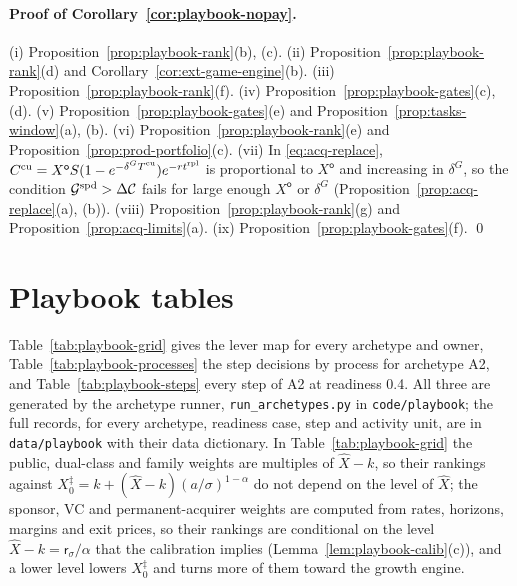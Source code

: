 \paragraph{Proof of Corollary~\ref{cor:playbook-nopay}.}
(i) Proposition~\ref{prop:playbook-rank}(b), (c). (ii) Proposition~\ref{prop:playbook-rank}(d) and Corollary~\ref{cor:ext-game-engine}(b). (iii) Proposition~\ref{prop:playbook-rank}(f). (iv) Proposition~\ref{prop:playbook-gates}(c), (d). (v) Proposition~\ref{prop:playbook-gates}(e) and Proposition~\ref{prop:tasks-window}(a), (b). (vi) Proposition~\ref{prop:playbook-rank}(e) and Proposition~\ref{prop:prod-portfolio}(c). (vii) In \eqref{eq:acq-replace}, $C^{\rm cu}=X^{\mathsf o}S(1-e^{-\delta^GT^{\rm cu}})e^{-rt^{\rm rpl}}$ is proportional to $X^{\mathsf o}$ and increasing in $\delta^G$, so the condition $\mathcal G^{\rm spd}>\Delta\mathcal C$ fails for large enough $X^{\mathsf o}$ or $\delta^G$ (Proposition~\ref{prop:acq-replace}(a), (b)). (viii) Proposition~\ref{prop:playbook-rank}(g) and Proposition~\ref{prop:acq-limits}(a). (ix) Proposition~\ref{prop:playbook-gates}(f). \qed

\section{Playbook tables}\label{app:playbook-tables}

Table~\ref{tab:playbook-grid} gives the lever map for every archetype and owner, Table~\ref{tab:playbook-processes} the step decisions by process for archetype A2, and Table~\ref{tab:playbook-steps} every step of A2 at readiness 0.4. All three are generated by the archetype runner, \texttt{run\_archetypes.py} in \texttt{code/playbook}; the full records, for every archetype, readiness case, step and activity unit, are in \texttt{data/playbook} with their data dictionary. In Table~\ref{tab:playbook-grid} the public, dual-class and family weights are multiples of $\hat X-k$, so their rankings against $X^\ddagger_0=k+(\hat X-k)(a/\sigma)^{1-\alpha}$ do not depend on the level of $\hat X$; the sponsor, VC and permanent-acquirer weights are computed from rates, horizons, margins and exit prices, so their rankings are conditional on the level $\hat X-k=\mathsf r_\sigma/\alpha$ that the calibration implies (Lemma~\ref{lem:playbook-calib}(c)), and a lower level lowers $X^\ddagger_0$ and turns more of them toward the growth engine. %

